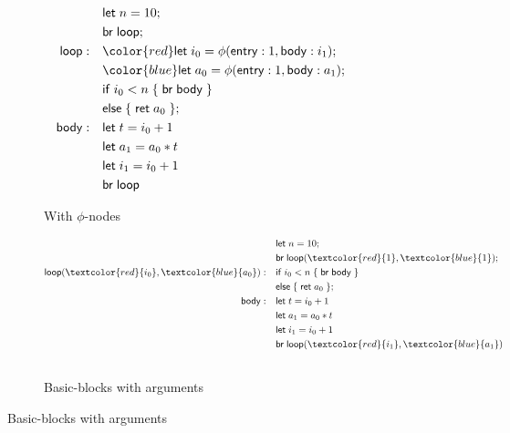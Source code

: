 \documentclass[acmsmall,screen,review]{acmart}
\newcommand{\ms}[1]{\ensuremath{\mathsf{#1}}}
\begin{document}
\begin{figure}
  \begin{subfigure}[t]{.5\textwidth}
    \centering
    \begin{align*}
                        & \ms{let}\;n = 10; \\
                        & \ms{br}\;\ms{loop}; \\
      \ms{loop}: \quad  & \begingroup \color{red}
                          \ms{let}\;i_0 = \phi(\ms{entry}: 1, \ms{body}: i_1);
                          \endgroup \\
                        & \begingroup \color{blue}
                          \ms{let}\;a_0 = \phi(\ms{entry}: 1, \ms{body}: a_1); 
                          \endgroup \\
                        & \ms{if}\;i_0 < n\;\{\;\ms{br}\;\ms{body}\;\} \\
                        & \ms{else}\;\{\;\ms{ret}\;a_0\;\}; \\
      \ms{body}: \quad  & \ms{let}\;t = i_0 + 1 \\
                        & \ms{let}\;a_1 = a_0 * t \\
                        & \ms{let}\;i_1 = i_0 + 1 \\
                        & \ms{br}\;\ms{loop}
    \end{align*}
    \caption{With $\phi$-nodes}
    \label{fig:fact-phi}
  \end{subfigure}%
  \begin{subfigure}[t]{.5\textwidth}
    \centering
    \begin{align*}
                                  & \ms{let}\;n = 10; \\
                                  & \ms{br}\;\ms{loop}(\textcolor{red}{1}, \textcolor{blue}{1}); \\
      \ms{loop}(\textcolor{red}{i_0}, \textcolor{blue}{a_0}): \quad  
                                  & \ms{if}\;i_0 < n\; \{\;\ms{br}\;\ms{body}\;\} \\
                                  & \ms{else}\;\{\;\ms{ret}\;a_0\;\}; \\
      \ms{body}: \quad            & \ms{let}\;t = i_0 + 1 \\
                                  & \ms{let}\;a_1 = a_0 * t \\
                                  & \ms{let}\;i_1 = i_0 + 1 \\
                                  & \ms{br}\;\ms{loop}(\textcolor{red}{i_1}, \textcolor{blue}{a_1})
                                  \\ \\
    \end{align*}
    \caption{Basic-blocks with arguments}
    \label{fig:fact-bba}
  \end{subfigure}
  

\end{figure}
\end{document}
